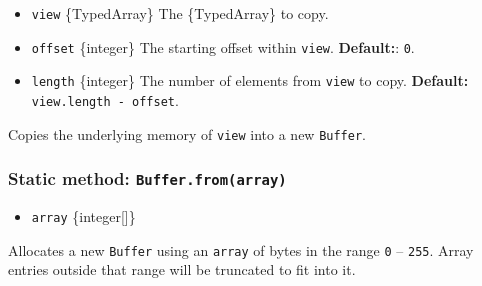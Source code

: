 \begin{itemize}
\tightlist
\item
  \texttt{view} \{TypedArray\} The \{TypedArray\} to copy.
\item
  \texttt{offset} \{integer\} The starting offset within \texttt{view}.
  \textbf{Default:}: \texttt{0}.
\item
  \texttt{length} \{integer\} The number of elements from \texttt{view}
  to copy. \textbf{Default:} \texttt{view.length\ -\ offset}.
\end{itemize}

Copies the underlying memory of \texttt{view} into a new
\texttt{Buffer}.

\begin{Shaded}
\begin{Highlighting}[]
\OperatorTok{=}  \NormalTok{([}\OperatorTok{,} \NormalTok{])}\OperatorTok{;}
\OperatorTok{=} \OperatorTok{,} \OperatorTok{,} \NormalTok{)}\OperatorTok{;}
\NormalTok{u16[}\NormalTok{] }\OperatorTok{=} \OperatorTok{;}
\NormalTok{)}\OperatorTok{;} 
\NormalTok{(buf[}\NormalTok{])}\OperatorTok{;} 
\NormalTok{(buf[}\NormalTok{])}\OperatorTok{;} 
\end{Highlighting}
\end{Shaded}

\subsubsection{\texorpdfstring{Static method:
\texttt{Buffer.from(array)}}{Static method: Buffer.from(array)}}\label{static-method-buffer.fromarray}

\begin{itemize}
\tightlist
\item
  \texttt{array} \{integer{[}{]}\}
\end{itemize}

Allocates a new \texttt{Buffer} using an \texttt{array} of bytes in the
range \texttt{0} -- \texttt{255}. Array entries outside that range will
be truncated to fit into it.

